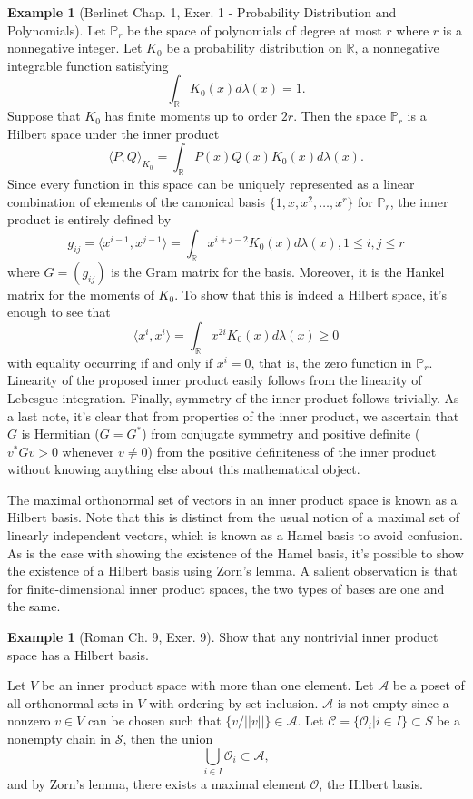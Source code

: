 \documentclass[psamsfonts]{amsart}
\theoremstyle{definition}
\newtheorem{exmp}[thm]{Example}
\theoremstyle{remark}
\numberwithin{equation}{section}
\begin{document}
\begin{exmp} [Berlinet Chap. 1, Exer. 1 - Probability Distribution and Polynomials]
Let $\mathbb{P}_r$ be the space of polynomials of degree at most $r$ where $r$ is a nonnegative integer. Let $K_0$ be a probability distribution on $\mathbb{R}$, a nonnegative integrable function satisfying 
$$\int _{\mathbb{R}} K_0(x) d \lambda (x) = 1.$$
Suppose that $K_0$ has finite moments up to order $2r$. Then the space $\mathbb{P}_r$ is a Hilbert space under the inner product 
$$\langle P, Q \rangle _{K_0} = \int _{\mathbb{R}} P(x)Q(x)K_0(x) d\lambda (x). $$
Since every function in this space can be uniquely represented as a linear combination of elements of the canonical basis $\{ 1, x, x^2 , \dots, x^r \}$ for $\mathbb{P}_r$, the inner product is entirely defined by 
$$g_{ij} = \langle x^{i-1} , x^{j-1} \rangle = \int _{\mathbb{R}} x^{i+j-2} K_0 (x) d\lambda (x), 1 \leq i, j \leq r$$
where $G= (g_{ij})$ is the Gram matrix for the basis. Moreover, it is the Hankel matrix for the moments of $K_0$. To show that this is indeed a Hilbert space, it's enough to see that 
$$\langle x^i , x^i \rangle = \int _{\mathbb{R}} x^{2i} K_0 (x) d\lambda (x) \geq 0 $$
with equality occurring if and only if $x^i = 0$, that is, the zero function in $\mathbb{P}_r$. Linearity of the proposed inner product easily follows from the linearity of Lebesgue integration. Finally, symmetry of the inner product follows trivially. As a last note, it's clear that from properties of the inner product, we ascertain that $G$ is Hermitian ($G = G^*$) from conjugate symmetry and positive definite ($v^*Gv > 0$ whenever $v \neq 0$) from the positive definiteness of the inner product without knowing anything else about this mathematical object.
\end{exmp}
The maximal orthonormal set of vectors in an inner product space is known as a Hilbert basis. Note that this is distinct from the usual notion of a maximal set of linearly independent vectors, which is known as a Hamel basis to avoid confusion. As is the case with showing the existence of the Hamel basis, it's possible to show the existence of a Hilbert basis using Zorn's lemma. A salient observation is that for finite-dimensional inner product spaces, the two types of bases are one and the same. 

\begin{exmp}[Roman Ch. 9, Exer. 9] Show that any nontrivial inner product space has a Hilbert basis. 

Let $V$ be an inner product space with more than one element. Let $\mathcal{A}$ be a poset of all orthonormal sets in $V$ with ordering by set inclusion. $\mathcal{A}$ is not empty since a nonzero $v \in V$ can be chosen such that $\{ v / || v|| \} \in \mathcal{A}.$ Let $\mathcal{C} = \{ \mathcal{O}_i | i \in I \} \subset S$ be a nonempty chain in $\mathcal{S}$, then the union
$$\bigcup _{i \in I} \mathcal{O} _i \subset \mathcal{A}, $$
and by Zorn's lemma, there exists a maximal element $\mathcal{O}$, the Hilbert basis. 
\end{exmp}
\end{document}
